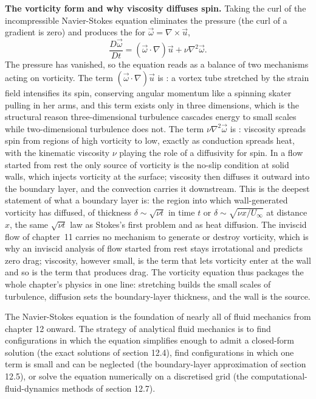 \begin{mastery}
\textbf{The vorticity form and why viscosity diffuses spin.} Taking the
curl of the incompressible Navier-Stokes equation eliminates the
pressure (the curl of a gradient is zero) and produces the
 for $\vec\omega = \nabla\times
\vec u$,
\[
\frac{D\vec\omega}{Dt} = (\vec\omega\cdot\nabla)\vec u + \nu\nabla^2
\vec\omega.
\]
The pressure has vanished, so the equation reads as a balance of two
mechanisms acting on vorticity. The term $(\vec\omega\cdot\nabla)
\vec u$ is : a vortex tube stretched by the
strain field intensifies its spin, conserving angular momentum like a
spinning skater pulling in her arms, and this term exists only in three
dimensions, which is the structural reason three-dimensional turbulence
cascades energy to small scales while two-dimensional turbulence does
not. The term $\nu\nabla^2\vec\omega$ is : viscosity spreads spin from regions of high vorticity to
low, exactly as conduction spreads heat, with the kinematic viscosity
$\nu$ playing the role of a diffusivity for spin. In a flow started from
rest the only source of vorticity is the no-slip condition at solid
walls, which injects vorticity at the surface; viscosity then diffuses
it outward into the boundary layer, and the convection carries it
downstream. This is the deepest statement of what a boundary layer is:
the region into which wall-generated vorticity has diffused, of
thickness $\delta \sim \sqrt{\nu t}$ in time $t$ or
$\delta \sim \sqrt{\nu x/U_\infty}$ at distance $x$, the same
$\sqrt{\nu t}$ law as Stokes's first problem and as heat diffusion. The
inviscid flow of chapter~11 carries no mechanism to generate or destroy
vorticity, which is why an inviscid analysis of flow started from rest
stays irrotational and predicts zero drag; viscosity, however small, is
the term that lets vorticity enter at the wall and so is the term that
produces drag. The vorticity equation thus packages the whole
chapter's physics in one line: stretching builds the small scales of
turbulence, diffusion sets the boundary-layer thickness, and the
wall is the source.
\end{mastery}

The Navier-Stokes equation is the foundation of nearly all of fluid
mechanics from chapter 12 onward. The strategy of analytical fluid
mechanics is to find configurations in which the equation
simplifies enough to admit a closed-form solution (the exact
solutions of section 12.4), find configurations in which one term
is small and can be neglected (the boundary-layer approximation of
section 12.5), or solve the equation numerically on a discretised
grid (the computational-fluid-dynamics methods of section 12.7).

